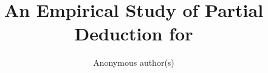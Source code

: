 \documentclass[runningheads]{llncs}
\begin{document}
\title{An Empirical Study of Partial Deduction for \mk}

%
%
\author{Anonymous author(s)}
%
%


\maketitle











\end{document}

